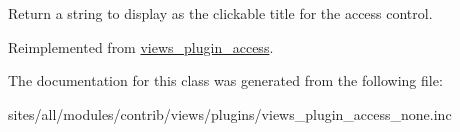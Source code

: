 Return a string to display as the clickable title for the access control. 

Reimplemented from \hyperlink{classviews__plugin__access_de500a95e599deffa417f8cbdd67bbf4}{views\_\-plugin\_\-access}.

The documentation for this class was generated from the following file:\begin{CompactItemize}
\item 
sites/all/modules/contrib/views/plugins/views\_\-plugin\_\-access\_\-none.inc\end{CompactItemize}
